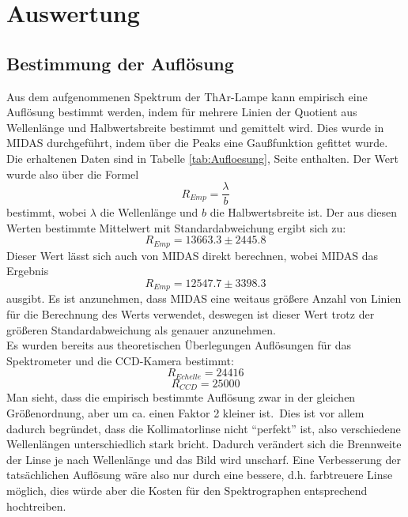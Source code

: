 \section{Auswertung}
\subsection{Bestimmung der Auflösung}
Aus dem aufgenommenen Spektrum der ThAr-Lampe kann empirisch eine Auflösung bestimmt werden, indem für mehrere Linien der Quotient aus Wellenlänge und Halbwertsbreite bestimmt und gemittelt wird. Dies wurde in MIDAS durchgeführt, indem über die Peaks eine Gaußfunktion gefittet wurde. Die erhaltenen Daten sind in Tabelle \ref{tab:Aufloesung}, Seite  \pageref{tab:Aufloesung} enthalten. Der Wert wurde also über die Formel
\begin{equation}
R_{Emp} = \frac{\lambda}{b}
\end{equation}
bestimmt, wobei $\lambda$ die Wellenlänge und $b$ die Halbwertsbreite ist. Der aus diesen Werten bestimmte Mittelwert mit Standardabweichung ergibt sich zu:
\begin{equation}
R_{Emp} = 13663.3 \pm 2445.8
\end{equation}
Dieser Wert lässt sich auch von MIDAS direkt berechnen, wobei MIDAS das Ergebnis
\begin{equation}
R_{Emp} = 12547.7 \pm 3398.3
\end{equation}
ausgibt. Es ist anzunehmen, dass MIDAS eine weitaus größere Anzahl von Linien für die Berechnung des Werts verwendet, deswegen ist dieser Wert trotz der größeren Standardabweichung als genauer anzunehmen.
\\
Es wurden bereits aus theoretischen Überlegungen Auflösungen für das Spektrometer und die CCD-Kamera bestimmt:
\begin{equation}
R_{Echelle} = 24416
\end{equation}
\begin{equation}
R_{CCD} =  25000
\end{equation}
Man sieht, dass die empirisch bestimmte Auflösung zwar in der gleichen Größenordnung, aber um ca. einen Faktor 2 kleiner ist.\
Dies ist vor allem dadurch begründet, dass die Kollimatorlinse nicht \enquote{perfekt} ist, also verschiedene Wellenlängen unterschiedlich stark bricht. Dadurch verändert sich die Brennweite der Linse je nach Wellenlänge und das Bild wird unscharf. Eine Verbesserung der tatsächlichen Auflösung wäre also nur durch eine bessere, d.h. farbtreuere Linse möglich, dies würde aber die Kosten für den Spektrographen entsprechend hochtreiben.

